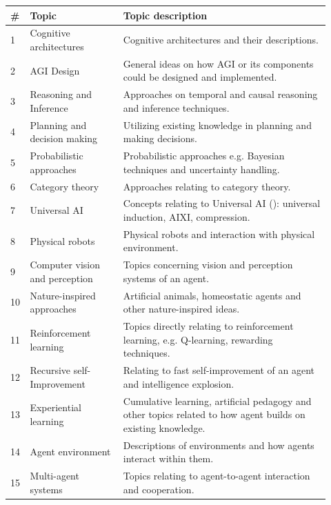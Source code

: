 \begin{table}[H]
  \footnotesize
  \centering
  \begin{tabular}{p{0.02\linewidth} p{0.28\linewidth} p{0.62\linewidth}}

    \textbf{\#} & \textbf{Topic}  & \textbf{Topic description}  \\ \hline
    1  & Cognitive architectures & Cognitive architectures and their descriptions.  \\ \hline
    2  & AGI Design & General ideas on how AGI or its components could be designed and implemented. \\ \hline
    3	 & Reasoning and Inference &  Approaches on temporal and causal reasoning and inference techniques. \\ \hline
    4	 & Planning and decision making & Utilizing existing knowledge in planning and making decisions. \\ \hline
    5	 & Probabilistic approaches & Probabilistic approaches e.g. Bayesian techniques and uncertainty handling.\\ \hline
    6	 & Category theory & Approaches relating to category theory.\\ \hline
    7	 & Universal AI & Concepts relating to Universal AI (\cite{hutter2004}): universal induction, AIXI, compression.\\ \hline
    8	 & Physical robots & Physical robots and interaction with physical environment. \\ \hline
    9	 & Computer vision and perception & Topics concerning vision and perception systems of an agent.\\ \hline
    10 & Nature-inspired approaches & Artificial animals, homeostatic agents and other nature-inspired ideas.\\ \hline
    11 & Reinforcement learning & Topics directly relating to reinforcement learning, e.g. Q-learning, rewarding techniques.\\ \hline
    12 & Recursive self-Improvement & Relating to fast self-improvement of an agent and intelligence explosion. \\ \hline
    13 & Experiential learning & Cumulative learning, artificial pedagogy and other topics related to how agent builds on existing knowledge.\\ \hline
    14 & Agent environment & Descriptions of environments and how agents interact within them.\\ \hline
    15 & Multi-agent systems & Topics relating to agent-to-agent interaction and cooperation.\\ \hline

\end{tabular}
\end{table}
